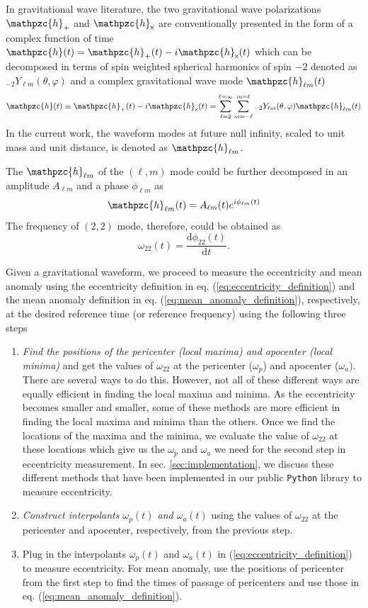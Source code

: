 \documentclass[aps,prd,amsmath,floats,floatfix, twocolumn,
superscriptaddress,nofootinbib,showpacs]{revtex4-1}
\newcommand{\into}{\!\times\!\relax} %
\newcommand{\h}{\mathpzc{h}}
\newcommand{\hlm}{\mathpzc{h}_{\ell m}}
\newcommand{\dd}{\mathrm{d}}
\begin{document}
In gravitational wave literature, the two gravitational wave
polarizations $\h_{+}$ and $\h_{\into}$ are conventionally presented
in the form of a complex function of time $\h(t) = \h_{+}(t) - i
\h_{\into}(t)$ which can be decomposed in terms of spin weighted
spherical harmonics of spin $-2$ denoted as ${}_{-2}Y_{\ell m}(\theta,
\varphi)$ and a complex gravitational wave mode $\hlm(t)$
\begin{equation}
  \label{eq:h} \h(t) \equiv \h_{+}(t) -i \h_{\into}(t) =
\sum_{\ell=2}^{\ell=\infty}\sum_{m=-\ell}^{m=\ell} {}_{-2}Y_{\ell
m}(\theta, \varphi) \hlm(t)
\end{equation} In the current work, the waveform modes at future null
infinity, scaled to unit mass and unit distance, is denoted as $\hlm$.

The $\hlm$ of the $(\ell, m)$ mode could be further decomposed in an
amplitude $A_{\ell m}$ and a phase $\phi_{\ell m}$ as
\begin{equation}
  \label{eq:amp-phase}
  \hlm(t) = A_{\ell m}(t) e^{i \phi_{\ell m}(t)}
\end{equation}
The frequency of $(2, 2)$ mode, therefore, could be obtained as
\begin{equation}
  \label{eq:omega22}
  \omega_{22}(t) = \frac{\dd \phi_{22}(t)}{\dd t}.
\end{equation}

Given a gravitational waveform, we proceed to measure the eccentricity
and mean anomaly using the eccentricity definition in
eq. (\ref{eq:eccentricity_definition}) and the mean anomaly definition
in eq. (\ref{eq:mean_anomaly_definition}), respectively, at the
desired reference time (or reference frequency) using the following
three steps

\begin{enumerate}
\item {\itshape Find the positions of the pericenter (local maxima)
and apocenter (local minima)} and get the values of $\omega_{22}$ at
the pericenter ($\omega_p$) and apocenter ($\omega_a$). There are
several ways to do this. However, not all of these different ways are
equally efficient in finding the local maxima and minima.  As the
eccentricity becomes smaller and smaller, some of these methods are
more efficient in finding the local maxima and minima than the
others. Once we find the locations of the maxima and the minima, we
evaluate the value of $\omega_{22}$ at these locations which give us
the $\omega_p$ and $\omega_a$ we need for the second step in
eccentricity measurement. In sec. \ref{sec:implementation}, we discuss
these different methods that have been implemented in our public
\texttt{Python} library to measure eccentricity.
\item {\itshape Construct interpolants $\omega_p(t)$ and
$\omega_a(t)$} using the values of $\omega_{22}$ at the pericenter and
apocenter, respectively, from the previous step.
\item Plug in the interpolants $\omega_p(t)$ and $\omega_a(t)$ in
(\ref{eq:eccentricity_definition}) to measure eccentricity. For mean
anomaly, use the positions of pericenter from the first step to find
the times of passage of pericenters and use those in
eq. (\ref{eq:mean_anomaly_definition}).
\end{enumerate}
\end{document}
